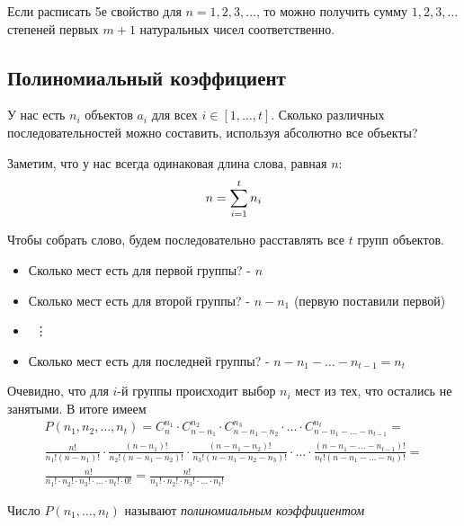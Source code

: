 \begin{note}
	Если расписать 5е свойство для $n = 1, 2, 3, \ldots$, то можно получить сумму $1, 2, 3, \ldots$ степеней первых $m + 1$ натуральных чисел соответственно.
\end{note}

\subsection{Полиномиальный коэффициент}

У нас есть $n_i$ объектов $a_i$ для всех $i \in [1, \ldots, t]$. Сколько различных последовательностей можно составить, используя абсолютно все объекты?

Заметим, что у нас всегда одинаковая длина слова, равная $n$:
\[
	n = \sum\limits_{i = 1}^t n_i
\]

Чтобы собрать слово, будем последовательно расставлять все $t$ групп объектов.
\begin{itemize}
	\item Сколько мест есть для первой группы? - $n$
	\item Сколько мест есть для второй группы? - $n - n_1$ (первую поставили первой)
	
	\item~\vdots
	\item Сколько мест есть для последней группы? - $n - n_1 - \ldots - n_{t - 1} = n_t$
\end{itemize}

Очевидно, что для $i$-й группы происходит выбор $n_i$ мест из тех, что остались не занятыми. В итоге имеем
\begin{multline*}
	P(n_1, n_2, \ldots, n_t) = C_n^{n_1} \cdot C_{n - n_1}^{n_2} \cdot C_{n - n_1 - n_2}^{n_3} \cdot \ldots \cdot C_{n - n_1 - \ldots - n_{t - 1}}^{n_t} = \\
	\frac{n!}{n_1! (n - n_1)!} \cdot \frac{(n - n_1)!}{n_2! (n - n_1 - n_2)!} \cdot \frac{(n - n_1 - n_2)!}{n_3! (n - n_1 - n_2 - n_3)!} \cdot \ldots \cdot \frac{(n - n_1 - \ldots - n_{t - 1})!}{n_t! (n - n_1 - \ldots - n_t)!} = \\
	\frac{n!}{n_1! \cdot n_2! \cdot n_3! \cdot \ldots \cdot n_t! \cdot 0!} = \frac{n!}{n_1! \cdot n_2! \cdot n_3! \cdot \ldots \cdot n_t!}
\end{multline*}

\begin{definition}
	Число $P(n_1, \ldots, n_t)$ называют \textit{полиномиальным коэффициентом}
\end{definition}

